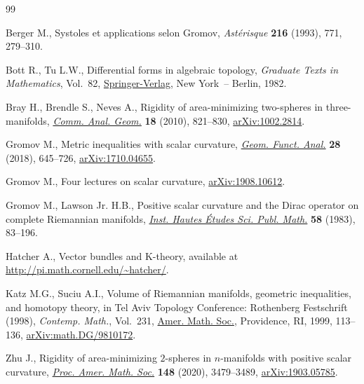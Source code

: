 \begin{thebibliography}{99}
\footnotesize\itemsep=0pt

Berger M., Systoles et applications selon {G}romov, \textit{Ast\'erisque}
 \textbf{216} (1993), 771, 279--310.

Bott R., Tu L.W., Differential forms in algebraic topology, \textit{Graduate
 Texts in Mathematics}, Vol.~82, \href{https://doi.org/10.1007/978-1-4757-3951-0}{Springer-Verlag}, New York~-- Berlin, 1982.

Bray H., Brendle S., Neves A., Rigidity of area-minimizing two-spheres in
 three-manifolds, \href{https://doi.org/10.4310/CAG.2010.v18.n4.a6}{\textit{Comm. Anal. Geom.}} \textbf{18} (2010), 821--830,
 \href{https://arxiv.org/abs/1002.2814}{arXiv:1002.2814}.

Gromov M., Metric inequalities with scalar curvature, \href{https://doi.org/10.1007/s00039-018-0453-z}{\textit{Geom. Funct.
 Anal.}} \textbf{28} (2018), 645--726, \href{https://arxiv.org/abs/1710.04655}{arXiv:1710.04655}.

Gromov M., Four lectures on scalar curvature, \href{https://arxiv.org/abs/1908.10612}{arXiv:1908.10612}.

Gromov M., Lawson Jr. H.B., Positive scalar curvature and the {D}irac operator
 on complete {R}iemannian manifolds, \href{https://doi.org/10.1007/BF02953774}{\textit{Inst. Hautes \'Etudes Sci. Publ.
 Math.}} \textbf{58} (1983), 83--196.

Hatcher A., Vector bundles and K-theory, available at
 \url{http://pi.math.cornell.edu/~hatcher/}.

Katz M.G., Suciu A.I., Volume of {R}iemannian manifolds, geometric
 inequalities, and homotopy theory, in Tel {A}viv {T}opology {C}onference:
 {R}othenberg {F}estschrift (1998), \textit{Contemp. Math.}, Vol.~231, \href{https://doi.org/10.1090/conm/231/03357}{Amer.
 Math. Soc.}, Providence, RI, 1999, 113--136, \href{https://arxiv.org/abs/math.DG/9810172}{arXiv:math.DG/9810172}.

Zhu J., Rigidity of area-minimizing {$2$}-spheres in {$n$}-manifolds with
 positive scalar curvature, \href{https://doi.org/10.1090/proc/15033}{\textit{Proc. Amer. Math. Soc.}} \textbf{148}
 (2020), 3479--3489, \href{https://arxiv.org/abs/1903.05785}{arXiv:1903.05785}.

\end{thebibliography}
